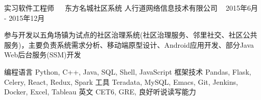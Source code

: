 \documentclass[11pt, a4paper, UTF8]{awesome-cv}
\begin{document}
\begin{cventries}
  \cventry
    {实习软件工程师{\ \cdotp\ \ }东方名城社区系统} %
    {人行道网络信息技术有限公司} %
    {\ } %
    {2015年6月 - 2015年12月} %
    {
      \begin{cvitems} %
        \item {参与开发以五角场镇为试点的社区治理系统(社区治理服务、邻里社交、社区公共服务)，主要负责系统需求分析、移动端原型设计、Android应用开发、部分Java Web后台服务(SSM)开发}
      \end{cvitems}
    }
    
\end{cventries}



%
\begin{cvskills}
  \cvskill
    {编程语言} %
    {Python, C++, Java, SQL, Shell, JavaScript} %
  \cvskill
    {框架技术} %
    {Pandas, Flask, Celery, React, Redux, Spark} %
  \cvskill
    {工具} %
    {Teradata, MySQL, Emacs, Git, Jenkins, Docker, Excel, Tableau} %
  \cvskill
    {英文} %
    {CET6, GRE, 良好听说读写能力} %
\end{cvskills}



%
%
%
%
%


\end{document}
